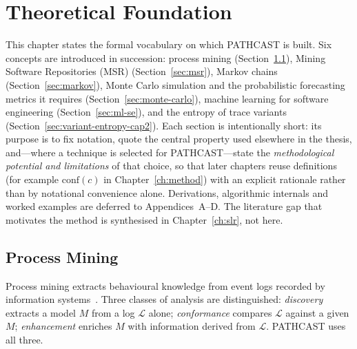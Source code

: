 
\chapter{Theoretical Foundation}
\label{ch:theoretical-foundation}

This chapter states the formal vocabulary on which PATHCAST is built. Six
concepts are introduced in succession: process mining
(Section~\ref{sec:process-mining}), Mining Software Repositories (MSR)
(Section~\ref{sec:msr}), Markov chains (Section~\ref{sec:markov}), Monte
Carlo simulation and the probabilistic forecasting metrics it requires
(Section~\ref{sec:monte-carlo}), machine learning for software engineering
(Section~\ref{sec:ml-se}), and the entropy of trace variants
(Section~\ref{sec:variant-entropy-cap2}). Each section is intentionally short:
its purpose is to fix notation, quote the central property used elsewhere in
the thesis, and---where a technique is selected for PATHCAST---state the
\emph{methodological potential and limitations} of that choice, so that later
chapters reuse definitions (for example $\text{conf}(c)$ in
Chapter~\ref{ch:method}) with an explicit rationale rather than by notational
convenience alone. Derivations, algorithmic internals and worked examples are
deferred to Appendices~A--D. The literature gap that motivates the method is
synthesised in Chapter~\ref{ch:slr}, not here.


\section{Process Mining}
\label{sec:process-mining}

Process mining extracts behavioural knowledge from event logs recorded by
information systems~\cite{aalst2016process}. Three classes of analysis are
distinguished: \emph{discovery} extracts a model $M$ from a log
$\mathcal{L}$ alone; \emph{conformance} compares $\mathcal{L}$ against a
given $M$; \emph{enhancement} enriches $M$ with information derived from
$\mathcal{L}$. PATHCAST uses all three.

